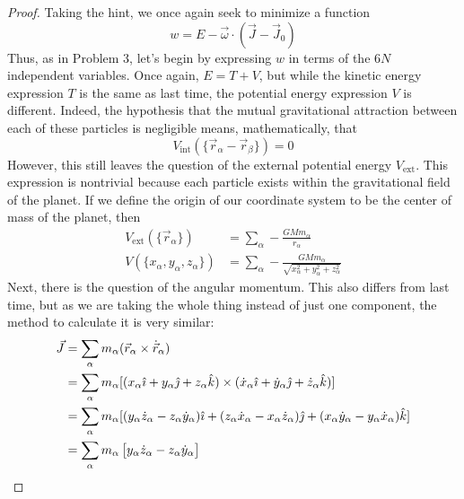 \documentclass[../psets.tex]{subfiles}
\begin{document}
\begin{enumerate}
\begin{proof}


        Taking the hint, we once again seek to minimize a function
        \begin{equation*}
            w = E-\vec{\omega}\cdot(\vec{J}-\vec{J}_0)
        \end{equation*}
        Thus, as in Problem 3, let's begin by expressing $w$ in terms of the $6N$ independent variables. Once again, $E=T+V$, but while the kinetic energy expression $T$ is the same as last time, the potential energy expression $V$ is different. Indeed, the hypothesis that the mutual gravitational attraction between each of these particles is negligible means, mathematically, that
        \begin{equation*}
            V_\text{int}(\{\vec{r}_\alpha-\vec{r}_\beta\}) = 0
        \end{equation*}
        However, this still leaves the question of the external potential energy $V_\text{ext}$. This expression is nontrivial because each particle exists within the gravitational field of the planet. If we define the origin of our coordinate system to be the center of mass of the planet, then
        \begin{align*}
            V_\text{ext}(\{\vec{r}_\alpha\}) &= \sum_\alpha -\frac{GMm_\alpha}{r_\alpha}\\
            V(\{x_\alpha,y_\alpha,z_\alpha\}) &= \sum_\alpha -\frac{GMm_\alpha}{\sqrt{x_\alpha^2+y_\alpha^2+z_\alpha^2}}
        \end{align*}
        Next, there is the question of the angular momentum. This also differs from last time, but as we are taking the whole thing instead of just one component, the method to calculate it is very similar:
        \begin{align*}
            \vec{J} &= \sum_\alpha m_\alpha(\vec{r}_\alpha\times\dot{\vec{r}}_\alpha)\\
            &= \sum_\alpha m_\alpha[(x_\alpha\hat{\imath}+y_\alpha\hat{\jmath}+z_\alpha\hat{k})\times(\dot{x}_\alpha\hat{\imath}+\dot{y}_\alpha\hat{\jmath}+\dot{z}_\alpha\hat{k})]\\
            &= \sum_\alpha m_\alpha[(y_\alpha\dot{z}_\alpha-z_\alpha\dot{y}_\alpha)\hat{\imath}+(z_\alpha\dot{x}_\alpha-x_\alpha\dot{z}_\alpha)\hat{\jmath}+(x_\alpha\dot{y}_\alpha-y_\alpha\dot{x}_\alpha)\hat{k}]\\
            &= \sum_\alpha m_\alpha
            \begin{bmatrix}
                y_\alpha\dot{z}_\alpha-z_\alpha\dot{y}_\alpha\\

\end{bmatrix}
\end{align*}
\end{proof}
\end{enumerate}
\end{document}
